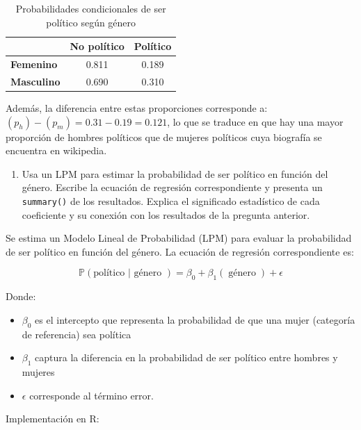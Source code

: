 \documentclass[
  12pt,
  a4paper,
]{article}
\providecommand{\tightlist}{%
  \setlength{\itemsep}{0pt}\setlength{\parskip}{0pt}}
\begin{document}
\begin{table}[!h]

\caption{\label{tab:table1}\label{tab:table1} Probabilidades condicionales de ser político según género}
\centering
\begin{tabular}[t]{>{\raggedright\arraybackslash}p{2cm}cc}
\toprule
\textbf{ } & \textbf{No político} & \textbf{Político}\\
\midrule
\textbf{Femenino} & 0.811 & 0.189\\
\textbf{Masculino} & 0.690 & 0.310\\
\bottomrule
\end{tabular}
\end{table}

Además, la diferencia entre estas proporciones corresponde a: \((p_h) - (p_m) = 0.31-0.19 = 0.121\), lo que se traduce en que hay una mayor proporción de hombres políticos que de mujeres políticos cuya biografía se encuentra en wikipedia.

\begin{enumerate}
\def\labelenumi{\arabic{enumi}.}
\setcounter{enumi}{1}
\tightlist
\item
  Usa un LPM para estimar la probabilidad de ser político en función del género. Escribe la ecuación de regresión correspondiente y presenta un \texttt{summary()} de los resultados. Explica el significado estadístico de cada coeficiente y su conexión con los resultados de la pregunta anterior.
\end{enumerate}

Se estima un Modelo Lineal de Probabilidad (LPM) para evaluar la probabilidad de ser político en función del género. La ecuación de regresión correspondiente es:

\[
\mathbb{P}(\text{político | género }) = \beta_{0} + \beta_{1}(\operatorname{género}) + \epsilon
\]

Donde:

\begin{itemize}
\tightlist
\item
  \(\beta_{0}\) es el intercepto que representa la probabilidad de que una mujer (categoría de referencia) sea política
\item
  \(\beta_{1}\) captura la diferencia en la probabilidad de ser político entre hombres y mujeres
\item
  \(\epsilon\) corresponde al término error.
\end{itemize}

Implementación en R:
\end{document}
